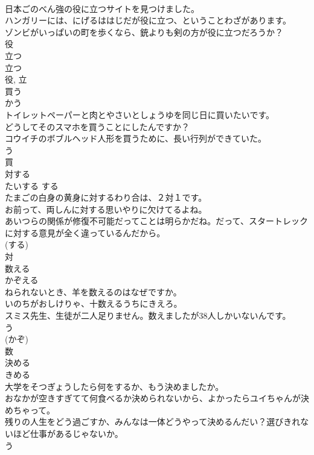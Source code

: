 \documentclass[8pt]{extreport}
\begin{document}
\begin{CJK}{UTF8}{min}
\\	日本ごのべん強の役に立つサイトを見つけました。	
\\	ハンガリーには、にげるははじだが役に立つ、ということわざがあります。	
\\	ゾンビがいっぱいの町を歩くなら、銃よりも剣の方が役に立つだろうか？	
\\	役 
\\	立つ 
\\	立つ 
\\	役, 立	
\\	買う	
\\	かう	
\\	トイレットペーパーと肉とやさいとしょうゆを同じ日に買いたいです。	
\\	どうしてそのスマホを買うことにしたんですか？	
\\	コウイチのボブルヘッド人形を買うために、長い行列ができていた。	
\\	う 
\\	買	
\\	対する	
\\	たいする	する 
\\	たまごの白身の黄身に対するわり合は、２対１です。	
\\	お前って、両しんに対する思いやりに欠けてるよね。	
\\	あいつらの関係が修復不可能だってことは明らかだね。だって、スタートレックに対する意見が全く違っているんだから。	
\\	(する) 
\\	対	
\\	数える	
\\	かぞえる	
\\	ねられないとき、羊を数えるのはなぜですか。	
\\	いのちがおしけりゃ、十数えるうちにきえろ。	
\\	スミス先生、生徒が二人足りません。数えましたが38人しかいないんです。	
\\	う 
\\	(かぞ) 
\\	数	
\\	決める	
\\	きめる	
\\	大学をそつぎょうしたら何をするか、もう決めましたか。	
\\	おなかが空きすぎてて何食べるか決められないから、よかったらユイちゃんが決めちゃって。	
\\	残りの人生をどう過ごすか、みんなは一体どうやって決めるんだい？選びきれないほど仕事があるじゃないか。	
\\	う 

\end{CJK}
\end{document}
